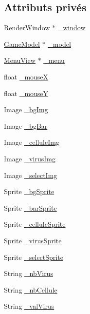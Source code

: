 \subsection*{Attributs privés}
\begin{DoxyCompactItemize}
\item 
RenderWindow $\ast$ \hyperlink{classGameView_a4b79e1b1fdf2706fc7f35f82339e9670}{\_\-window}
\item 
\hyperlink{classGameModel}{GameModel} $\ast$ \hyperlink{classGameView_abe19de5d866286b6bedbdccfbd0e4b2a}{\_\-model}
\item 
\hyperlink{classMenuView}{MenuView} $\ast$ \hyperlink{classGameView_ac0ac2e291baed6e80347634f47272fd7}{\_\-menu}
\item 
float \hyperlink{classGameView_a2d765cce80b99c3660c648d5525291eb}{\_\-mouseX}
\item 
float \hyperlink{classGameView_ae0832db163064926175fa2137c7bd616}{\_\-mouseY}
\item 
Image \hyperlink{classGameView_a29463f9906b567411726e58e4a8ce49d}{\_\-bgImg}
\item 
Image \hyperlink{classGameView_a11dee7b43c5c6ad7f8c5db71a2ef6878}{\_\-bgBar}
\item 
Image \hyperlink{classGameView_ae10a0a81a81efa48da63a7736254909a}{\_\-celluleImg}
\item 
Image \hyperlink{classGameView_a65d945763d5142e2569713a2ea97105c}{\_\-virusImg}
\item 
Image \hyperlink{classGameView_a8513c86472e329c64c3c448b4065d740}{\_\-selectImg}
\item 
Sprite \hyperlink{classGameView_ac6819082a39637d9f196a2a522c03ce3}{\_\-bgSprite}
\item 
Sprite \hyperlink{classGameView_aa316a069a21272495b6f1cdea1d9f8eb}{\_\-barSprite}
\item 
Sprite \hyperlink{classGameView_a5dc37e11b46be3b5f391e0345d3c47c9}{\_\-celluleSprite}
\item 
Sprite \hyperlink{classGameView_abfeeff8ffaff6a07b5d6573a1dbe59b4}{\_\-virusSprite}
\item 
Sprite \hyperlink{classGameView_a640dce0c607b48e11fd24068a9034433}{\_\-selectSprite}
\item 
String \hyperlink{classGameView_adc9c13fbb9ba7d91c1f7c9ea08b5c7d3}{\_\-nbVirus}
\item 
String \hyperlink{classGameView_ab6aad61f347ae5585c6098ea634093d5}{\_\-nbCellule}
\item 
String \hyperlink{classGameView_abda9191ca7ec8d884c2736b35307efba}{\_\-valVirus}

\end{DoxyCompactItemize}
